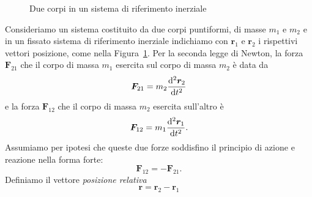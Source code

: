 \begin{figure}
  \centering
  \caption{Due corpi in un sistema di riferimento inerziale}
  \label{fig:due-corpi}
\end{figure}
Consideriamo un sistema costituito da due corpi puntiformi, di masse $m_1$ e
$m_2$ e in un fissato sistema di riferimento inerziale indichiamo con $\bm{r}_1$
e $\bm{r}_2$ i rispettivi vettori posizione, come nella
Figura~\ref{fig:due-corpi}. Per la seconda legge di Newton, la forza
$\bm{F}_{21}$ che il corpo di massa $m_1$ esercita sul corpo di massa $m_2$ è
data da
\begin{equation}
  \label{eq:f21}
  \bm{F}_{21} = m_2\toder[2]{\bm{r}_2}{t}
\end{equation}
e la forza $\bm{F}_{12}$ che il corpo di massa $m_2$ esercita sull'altro è
\begin{equation}
  \label{eq:f12}
  \bm{F}_{12} = m_1\toder[2]{\bm{r}_1}{t}.
\end{equation}
Assumiamo per ipotesi che queste due forze soddisfino il principio di azione e
reazione nella forma forte:
\begin{equation}
  \label{eq:azione-reazione}
  \bm{F}_{12} = -\bm{F}_{21}.
\end{equation}
Definiamo il vettore \emph{posizione relativa}
\begin{equation}
  \label{eq:posizione-relativa}
  \bm{r}=\bm{r}_2-\bm{r}_1
\end{equation}
